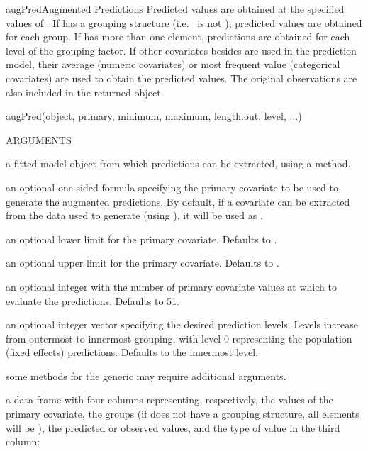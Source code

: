 \documentclass[pdftex]{article} \usepackage{url,graphicx}
\begin{document}
\begin{Helpfile}{augPred}{Augmented Predictions}
Predicted values are obtained at the specified values of
. If  has a grouping structure
(i.e.\  is not ), predicted values
are obtained for each group. If  has more than one
element, predictions are obtained for each level of the
 grouping factor. If other covariates besides
 are used in the prediction model, their average
(numeric covariates) or most frequent value (categorical covariates)
are used to obtain the predicted values. The original observations are
also included in the returned object.
\begin{Example}
augPred(object, primary, minimum, maximum, length.out, level, ...)
\end{Example}
\begin{Argument}{ARGUMENTS}
\item[\Co{object:}]
a fitted model object from which predictions can be
extracted, using a  method.
\item[\Co{primary:}]
an optional one-sided formula specifying the primary
covariate to be used to generate the augmented predictions. By
default, if a  covariate can be extracted from the data used to generate
 (using ), it will be used as
.
\item[\Co{minimum:}]
an optional lower limit for the primary
covariate. Defaults to .
\item[\Co{maximum:}]
an optional upper limit for the primary
covariate. Defaults to .
\item[\Co{length.out:}]
an optional integer with the number of primary
covariate values at which to evaluate the predictions. Defaults to
51.
\item[\Co{level:}]
an optional integer vector specifying the desired
prediction levels. Levels increase from outermost to innermost
grouping, with level 0 representing the population (fixed effects)
predictions. Defaults to the innermost level.
\item[\Co{...:}]
some methods for the generic may require additional
arguments.
\end{Argument}
a data frame with four columns representing, respectively, the values
of the primary covariate, the groups (if  does not have a
grouping structure, all elements will be ), the predicted or
observed values, and the type of value in the third column:

\end{Helpfile}
\end{document}
